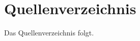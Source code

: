 \clearpage

\clearpage

\clearpage
\tableofcontents
\clearpage
{}

\clearpage

\clearpage

\clearpage

\clearpage

\clearpage

\clearpage

\clearpage

\clearpage

\clearpage
\listoffigures
\listoftables
\section*{Quellenverzeichnis}
Das Quellenverzeichnis folgt. 
